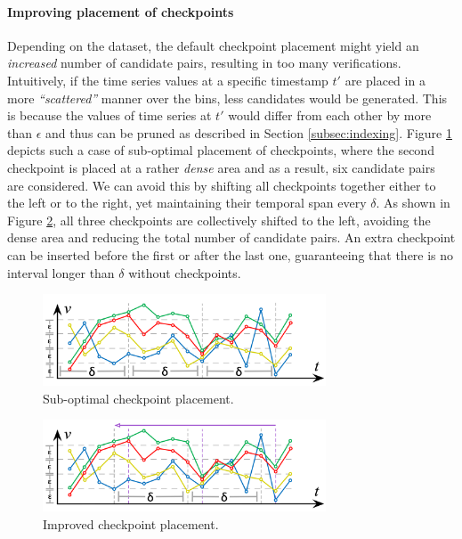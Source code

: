 \paragraph{Improving placement of checkpoints} Depending on the dataset, the default checkpoint placement might yield an \textit{increased} number of candidate pairs, resulting in too many verifications. Intuitively, if the time series values at a specific timestamp $t'$ are placed in a more \textit{``scattered''} manner over the bins, less candidates would be generated. This is because the values of time series at $t'$ would differ from each other by more than $\epsilon$ and thus can be pruned as described in Section \ref{subsec:indexing}. Figure \ref{fig:opt1} depicts such a case of sub-optimal placement of checkpoints, where the second checkpoint is placed at a rather \textit{dense} area and as a result, six candidate pairs are considered. We can avoid this by shifting all checkpoints together either to the left or to the right, yet maintaining their temporal span every $\delta$. As shown in Figure \ref{fig:opt2}, all three checkpoints are collectively shifted to the left, avoiding the dense area and reducing the total number of candidate pairs. An extra checkpoint can be inserted before the first or after the last one, guaranteeing that there is no interval longer than $\delta$ without checkpoints.

\begin{figure}[!tb]
    \centering
    \includegraphics[width=0.75\textwidth]{figures/sub_opt.png}
    \caption{Sub-optimal checkpoint placement.}
    \label{fig:opt1}
\end{figure}

\begin{figure}[!tb]
    \centering
    \includegraphics[width=0.75\textwidth]{figures/opt.png}
    \caption{Improved checkpoint placement.}
    \label{fig:opt2}
\end{figure}


